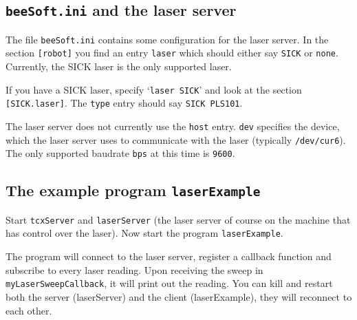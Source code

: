 \documentclass{article}
\begin{document}
\subsection{\texttt{beeSoft.ini} and the laser server}

The file \texttt{beeSoft.ini} contains some configuration for the laser
server.  In the section \texttt{[robot]} you find an entry \texttt{laser}
which should either say \texttt{SICK} or \texttt{none}. Currently, the
SICK laser is the only supported laser.

If you have a SICK laser, specify `\texttt{laser SICK}' and look at the
section \texttt{[SICK.laser]}. The \texttt{type} entry should say
\texttt{SICK PLS101}.

The laser server does not currently use the \texttt{host} entry. \texttt{dev}
specifies the device, which the laser server uses to communicate with the
laser (typically \texttt{/dev/cur6}). The only supported baudrate \texttt{bps}
at this time is \texttt{9600}.

\subsection{The example program \texttt{laserExample}}
 
Start \texttt{tcxServer} and \texttt{laserServer} (the laser server of
course on the machine that has control over the laser). Now start the program
\texttt{laserExample}.

The program will connect to the laser server, register a callback function and
subscribe to every laser reading. Upon receiving the sweep in
\texttt{myLaserSweepCallback}, it will print out the reading. You can kill and
restart both the server (laserServer) and the client (laserExample), they will
reconnect to each other.
\end{document}
